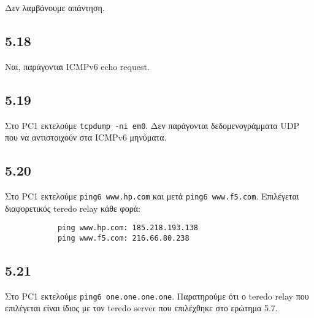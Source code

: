 \documentclass[a4paper, 12pt]{article}
\begin{document}
		Δεν λαμβάνουμε απάντηση.

	\subsection*{5.18}
		Nαι, παράγονται ICMPv6 echo request.

	\subsection*{5.19} 
		Στο PC1 εκτελούμε \verb|tcpdump -ni em0|. Δεν παράγονται δεδομενογράμματα UDP που να αντιστοιχούν στα ICMPv6 μηνύματα.

	\subsection*{5.20}
		Στο PC1 εκτελούμε \verb|ping6 www.hp.com| και μετά \verb|ping6 www.f5.com|. Επιλέγεται διαφορετικός teredo relay κάθε φορά:
		
		\begin{verbatim}
			ping www.hp.com: 185.218.193.138
			ping www.f5.com: 216.66.80.238
		\end{verbatim}		

	\subsection*{5.21} 
		Στο PC1 εκτελούμε \verb|ping6 one.one.one.one|. Παρατηρούμε ότι ο teredo relay που επιλέγεται είναι ίδιος με τον teredo server που επιλέχθηκε στο ερώτημα 5.7.
		
\end{document}
